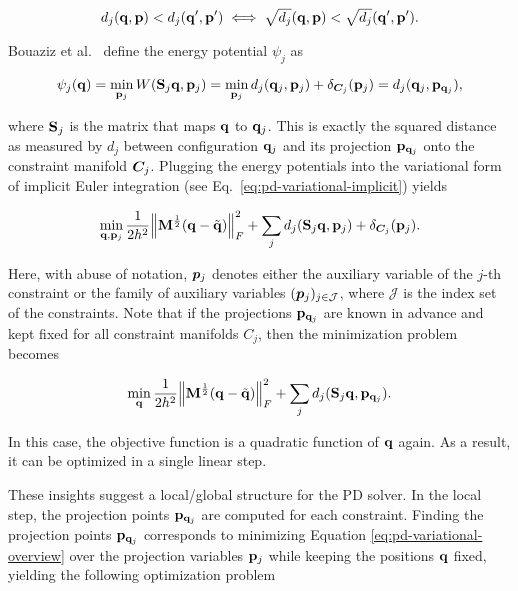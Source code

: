 \[
    d_j(\mathbf{q}, \mathbf{p}) < d_j(\mathbf{q}^\prime, \mathbf{p}^\prime) \iff \sqrt{d_j}(\mathbf{q}, \mathbf{p}) < \sqrt{d_j}(\mathbf{q}^\prime, 
    \mathbf{p}^\prime).
\]

Bouaziz et al.\ \cite{bouaziz2014} define the energy potential $\psi_j$ as 

\begin{equation}\label{eq:pd-min-W}
    \psi_j(\mathbf{q}) = \min_{\mathbf{p}_j} W(\mathbf{S}_j\mathbf{q}, \mathbf{p}_j) 
    = \min_{\mathbf{p}_j} d_j(\mathbf{q}_j, \mathbf{p}_j) + \delta_{\bm{C}_j}(\mathbf{p}_j)
    = d_j(\mathbf{q}_j, \mathbf{p}_{\mathbf{q}_j}),
\end{equation}

\noindent where $\mathbf{S}_j$ is the matrix that maps $\mathbf{q}$ to $\mathbf{q}_j$. This is exactly the squared distance as measured by 
$d_j$ between configuration $\mathbf{q}_j$ and its projection $\mathbf{p}_{\mathbf{q}_j}$ onto the constraint manifold $\bm{C}_j$. 
Plugging the energy potentials into the variational form of implicit Euler integration (see Eq.\ \ref{eq:pd-variational-implicit}) yields

\begin{equation}\label{eq:pd-variational-overview}
    \min_{\mathbf{q}, \mathbf{p}_j} \frac{1}{2h^2} \norm{\mathbf{M}^{\frac{1}{2}}(\mathbf{q} - \tilde{\mathbf{q}})}^2_F + 
    \sum_j d_j(\mathbf{S}_j \mathbf{q}, \mathbf{p}_j) + \delta_{\bm{C}_j}(\mathbf{p}_j).
\end{equation}

\noindent Here, with abuse of notation, $\bm{p}_j$ denotes either the auxiliary variable of the $j$-th constraint or 
the family of auxiliary variables $(\bm{p}_j)_{j \in \mathcal{J}}$, where $\mathcal{J}$ is the index set of the 
constraints. Note that if the projections $\mathbf{p}_{\mathbf{q}_j}$ are known in advance and kept fixed for all constraint 
manifolds $C_j$, then the minimization problem becomes

\begin{equation}\label{eq:pd-global-d}
    \min_\mathbf{q} \frac{1}{2h^2} \norm{\mathbf{M}^{\frac{1}{2}}(\mathbf{q} - \tilde{\mathbf{q}})}^2_F + \sum_j d_j(\mathbf{S}_j
    \mathbf{q}, \mathbf{p}_{\mathbf{q}_j}).
\end{equation}

\noindent In this case, the objective function is a quadratic function of $\mathbf{q}$ again. As a result, it can be optimized in a single 
linear step. 

These insights suggest a local/global structure for the PD solver. In the local step, the projection points $\mathbf{p}_{\mathbf{q}_j}$
are computed for each constraint. Finding the projection points $\mathbf{p}_{\mathbf{q}_j}$ corresponds to minimizing 
Equation \ref{eq:pd-variational-overview} over the projection variables $\mathbf{p}_j$ while keeping the positions $\mathbf{q}$ fixed, yielding
the following optimization problem

